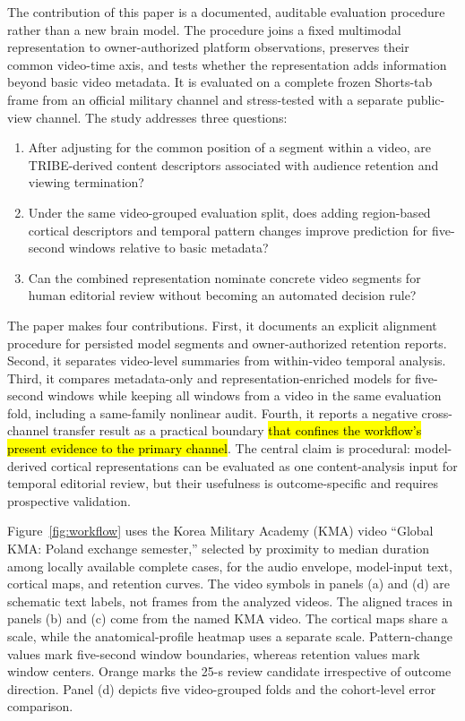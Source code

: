 \documentclass{ieeeaccess}
\newcommand{\rev}[1]{\hl{#1}}
\newcommand{\rev}[1]{#1}
\begin{document}
The contribution of this paper is a documented, auditable evaluation procedure rather than a new brain model. The procedure joins a fixed multimodal representation to owner-authorized platform observations, preserves their common video-time axis, and tests whether the representation adds information beyond basic video metadata. It is evaluated on a complete frozen Shorts-tab frame from an official military channel and stress-tested with a separate public-view channel. The study addresses three questions:

\begin{enumerate}
    \item After adjusting for the common position of a segment within a video, are TRIBE-derived content descriptors associated with audience retention and viewing termination?
    \item Under the same video-grouped evaluation split, does adding region-based cortical descriptors and temporal pattern changes improve prediction for five-second windows relative to basic metadata?
    \item Can the combined representation nominate concrete video segments for human editorial review without becoming an automated decision rule?
\end{enumerate}

The paper makes four contributions. First, it documents an explicit alignment procedure for persisted model segments and owner-authorized retention reports. Second, it separates video-level summaries from within-video temporal analysis. Third, it compares metadata-only and representation-enriched models for five-second windows while keeping all windows from a video in the same evaluation fold, including a same-family nonlinear audit. Fourth, it reports a negative cross-channel transfer result as a practical boundary \rev{that confines the workflow's present evidence to the primary channel}. The central claim is procedural: model-derived cortical representations can be evaluated as one content-analysis input for temporal editorial review, but their usefulness is outcome-specific and requires prospective validation.

Figure~\ref{fig:workflow} uses the Korea Military Academy (KMA) video “Global KMA: Poland exchange semester,” selected by proximity to median duration among locally available complete cases, for the audio envelope, model-input text, cortical maps, and retention curves. The video symbols in panels (a) and (d) are schematic text labels, not frames from the analyzed videos. The aligned traces in panels (b) and (c) come from the named KMA video. The cortical maps share a scale, while the anatomical-profile heatmap uses a separate scale. Pattern-change values mark five-second window boundaries, whereas retention values mark window centers. Orange marks the 25-s review candidate irrespective of outcome direction. Panel (d) depicts five video-grouped folds and the cohort-level error comparison.
\end{document}
